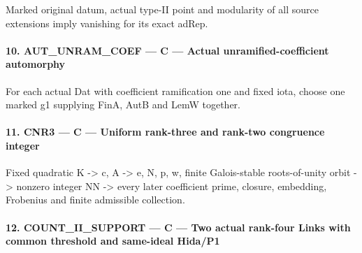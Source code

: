 Marked original datum, actual type-II point and modularity of all source extensions imply vanishing for its exact adRep.


\paragraph{10. AUT\_\allowbreak{}UNRAM\_\allowbreak{}COEF — C — Actual unramified-coefficient automorphy}

For each actual Dat with coefficient ramification one and fixed iota, choose one marked g1 supplying FinA, AutB and LemW together.


\paragraph{11. CNR3 — C — Uniform rank-three and rank-two congruence integer}

Fixed quadratic K -> c,\allowbreak{} A -> e,\allowbreak{} N,\allowbreak{} p,\allowbreak{} w,\allowbreak{} finite Galois-stable roots-of-unity orbit -> nonzero integer NN -> every later coefficient prime, closure, embedding, Frobenius and finite admissible collection.


\paragraph{12. COUNT\_\allowbreak{}II\_\allowbreak{}SUPPORT — C — Two actual rank-four Links with common threshold and same-ideal Hida/\allowbreak{}P1}

